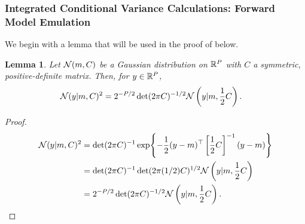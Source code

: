 \documentclass[12pt]{article}
\newtheorem{lemma}{Lemma}
\begin{document}
\subsubsection{Integrated Conditional Variance Calculations: Forward Model Emulation}

We begin with a lemma that will be used in the proof of  below. 
\begin{lemma} \label{lemma:squared_Gaussian_density}
Let $\mathcal{N}(m, C)$ be a Gaussian distribution on $\mathbb{R}^{P}$ with $C$ a symmetric, positive-definite 
matrix. Then, for $y \in \mathbb{R}^{P}$, 
\begin{align*}
\mathcal{N}(y | m, C)^2 
&= 2^{-P/2} \det(2\pi C)^{-1/2} \mathcal{N}\left(y | m, \frac{1}{2}C\right). 
\end{align*}
\end{lemma}

\begin{proof}
\begin{align*}
\mathcal{N}(y | m, C)^2 
&= \det(2\pi C)^{-1} \exp\mathopen{}\left\{-\frac{1}{2} (y - m)^\top \left[\frac{1}{2}C \right]^{-1}(y - m)\right\}\mathclose{} \\
&= \det(2\pi C)^{-1} \det(2\pi (1/2)C)^{1/2} \mathcal{N}\left(y | m, \frac{1}{2}C\right) \\
&= 2^{-P/2} \det(2\pi C)^{-1/2} \mathcal{N}\left(y | m, \frac{1}{2}C\right). 
\end{align*}
\end{proof}
\end{document}
